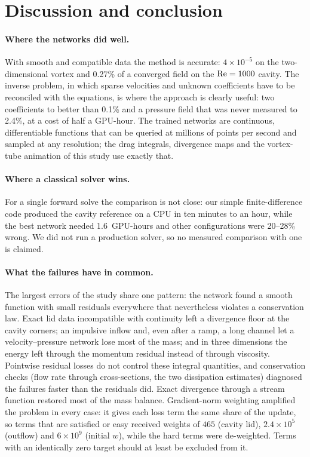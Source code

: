 \section{Discussion and conclusion}
\label{sec:discussion}

\paragraph{Where the networks did well.} With smooth and compatible data the method is accurate: $4\times10^{-5}$
on the two-dimensional vortex and 0.27\% of a converged field on the $\mathrm{Re}=1000$ cavity. The inverse problem, in
which sparse velocities and unknown coefficients have to be reconciled with the equations, is where the approach
is clearly useful: two coefficients to better than 0.1\% and a pressure field that was never measured to 2.4\%,
at a cost of half a GPU-hour. The trained networks are continuous, differentiable functions that can be queried
at millions of points per second and sampled at any resolution; the drag integrals, divergence maps and the
vortex-tube animation of this study use exactly that.

\paragraph{Where a classical solver wins.} For a single forward solve the comparison is not close: our simple
finite-difference code produced the cavity reference on a CPU in ten minutes to an hour, while the best network
needed 1.6~GPU-hours and other configurations were 20--28\% wrong. We did not run a production solver, so no
measured comparison with one is claimed.

\paragraph{What the failures have in common.} The largest errors of the study share one pattern: the network
found a smooth function with small residuals everywhere that nevertheless violates a conservation law. Exact lid
data incompatible with continuity left a divergence floor at the cavity corners; an impulsive inflow and, even after
a ramp, a long channel let a velocity--pressure network lose most of the mass; and in three dimensions the energy
left through the momentum residual instead of through viscosity. Pointwise residual losses do not control these
integral quantities, and conservation checks (flow rate through cross-sections, the two dissipation estimates)
diagnosed the failures faster than the residuals did. Exact divergence through a stream function restored most of
the mass balance. Gradient-norm weighting amplified the problem in every case: it gives each loss term the same
share of the update, so terms that are satisfied or easy received weights of $465$ (cavity lid),
$2.4\times10^5$ (outflow) and $6\times10^9$ (initial $w$), while the hard terms were de-weighted. Terms with an
identically zero target should at least be excluded from it.

